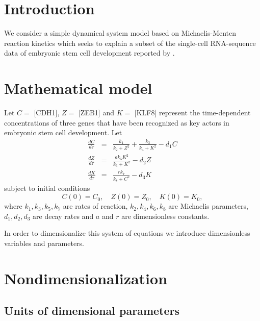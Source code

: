 \documentclass[10pt,letterpaper]{article}
\begin{document}


\section{Introduction}

We consider a simple dynamical system model based on Michaelis-Menten reaction kinetics \cite{tu2019single} which seeks to explain a subset of the single-cell RNA-sequence data of  embryonic stem cell development reported by \cite{chu2016single}.

\section{Mathematical model}

Let $C=$ [CDH1], $Z=$ [ZEB1] and $K=$ [KLF8] represent the time-dependent concentrations of three genes that have been recognized as key actors in embryonic stem cell development. Let
\begin{eqnarray}
\frac{dC}{d\tau} &=& \frac{k_1}{k_2 + Z^2} + \frac{k_3}{k_4 + K^2} - d_1 C  \label{eq:de_one} \\
\frac{dZ}{d\tau} &=& \frac{a k_5 K^2}{k_6 + K^2} - d_2 Z \label{eq:de_two} \\
\frac{dK}{d\tau} &=& \frac{r k_7}{k_8 + C^2} - d_3 K \label{eq:de_three}
\end{eqnarray}
subject to initial conditions
\begin{equation}
C(0) = C_0, \quad Z(0) = Z_0, \quad K(0) = K_0,
\end{equation}
where $k_1, k_3, k_5, k_7$ are rates of reaction, $k_2, k_4, k_6, k_8$ are Michaelis parameters, $d_1, d_2, d_3$ are decay rates and $a$ and $r$ are dimensionless constants.

In order to dimensionalize this system of equations we introduce dimensionless variables and parameters.

\section{Nondimensionalization}

\subsection{Units of dimensional parameters}
\end{document}

